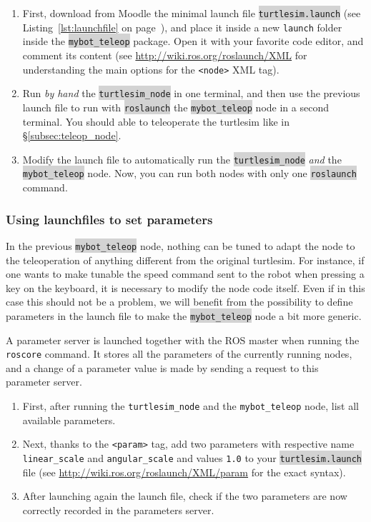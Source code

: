 \documentclass[10pt,a4paper,printanswers]{upmc}
\newcounter{mainmemorder}
\newcommand{\save}{\setcounter{mainmemorder}{\value{enumi}}}
\newcommand{\load}{\setcounter{enumi}{\value{mainmemorder}}}
\newcommand{\mytext}[1]{\colorbox{lightgray}{\texttt{#1}}}
\begin{document}
\begin{enumerate}
  \item First, download from Moodle the minimal launch file \mytext{turtlesim.launch} (see
        Listing~\ref{lst:launchfile} on page~\pageref{lst:launchfile}), and place it inside a new
        \texttt{launch} folder inside the \mytext{mybot\_teleop} package. Open it with your favorite
        code editor, and comment its content (see \url{http://wiki.ros.org/roslaunch/XML} for
        understanding the main options for the \texttt{<node>} XML tag).
  \item Run \emph{by hand} the \mytext{turtlesim\_node} in one terminal, and then use the previous
        launch file to run with \mytext{roslaunch} the \mytext{mybot\_teleop} node in a second
        terminal. You should able to teleoperate the turtlesim like in \S\ref{subsec:teleop_node}.
  \item Modify the launch file to automatically run the \mytext{turtlesim\_node} \emph{and} the
        \mytext{mybot\_teleop} node. Now, you can run both nodes with only one \mytext{roslaunch}
        command.
        \save
\end{enumerate}

\subsubsection{Using launchfiles to set parameters}
In the previous \mytext{mybot\_teleop} node, nothing can be tuned to adapt the node to the
teleoperation of anything different from the original turtlesim. For instance, if one wants to make
tunable the speed command sent to the robot when pressing a key on the keyboard, it is necessary to
modify the node code itself. Even if in this case this should not be a problem, we will benefit from
the possibility to define parameters in the launch file to make the \mytext{mybot\_teleop} node a
bit more generic.

A parameter server is launched together with the ROS master when running the \texttt{roscore}
command. It stores all the parameters of the currently running nodes, and a change of a parameter
value is made by sending a request to this parameter server.

\begin{enumerate}
  \load
  \item First, after running the \texttt{turtlesim\_node} and the \texttt{mybot\_teleop} node, list
        all available parameters.
  \item Next, thanks to the \texttt{<param>} tag, add two parameters with respective name
        \texttt{linear\_scale} and \texttt{angular\_scale} and values \texttt{1.0} to your
        \mytext{turtlesim.launch} file (see \url{http://wiki.ros.org/roslaunch/XML/param} for the
        exact syntax).
  \item After launching again the launch file, check if the two parameters are now correctly
        recorded in the parameters server.
        \save
\end{enumerate}
\end{document}
